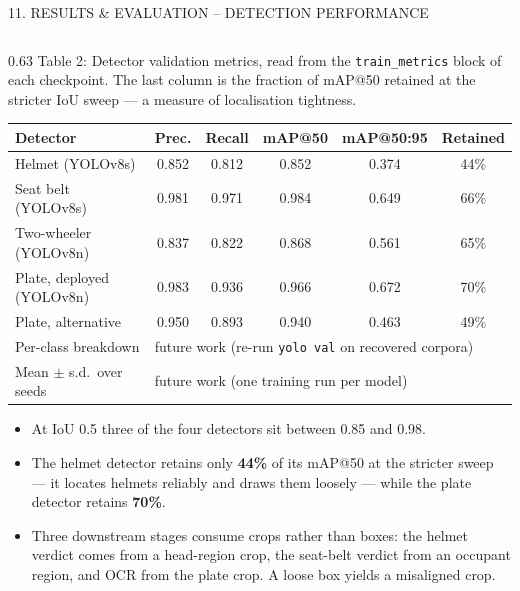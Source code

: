 \documentclass[aspectratio=169,10pt,t]{beamer}
\begin{document}
\begin{frame}{11. RESULTS \& EVALUATION -- DETECTION PERFORMANCE}
\begin{columns}[T,onlytextwidth]
\begin{column}{0.63\textwidth}
\scriptsize
{\tiny Table 2: Detector validation metrics, read from the \texttt{train\_metrics} block of each checkpoint. The last
column is the fraction of mAP@50 retained at the stricter IoU sweep --- a measure of localisation tightness.}\\[0.2em]
\setlength{\tabcolsep}{2.4pt}
\begin{tabular}{@{}lccccc@{}}
\toprule
\textbf{Detector} & \textbf{Prec.} & \textbf{Recall} & \textbf{mAP@50} & \textbf{mAP@50:95} & \textbf{Retained}\\
\midrule
Helmet (YOLOv8s) & 0.852 & 0.812 & 0.852 & 0.374 & 44\%\\
Seat belt (YOLOv8s) & 0.981 & 0.971 & 0.984 & 0.649 & 66\%\\
Two-wheeler (YOLOv8n) & 0.837 & 0.822 & 0.868 & 0.561 & 65\%\\
Plate, deployed (YOLOv8n) & 0.983 & 0.936 & 0.966 & 0.672 & 70\%\\
Plate, alternative & 0.950 & 0.893 & 0.940 & 0.463 & 49\%\\
\midrule
Per-class breakdown & \multicolumn{5}{l}{future work (re-run \texttt{yolo val} on recovered corpora)}\\
Mean $\pm$ s.d.\ over seeds & \multicolumn{5}{l}{future work (one training run per model)}\\
\bottomrule
\end{tabular}
\vspace{0.4em}
\begin{itemize}\setlength{\itemsep}{0.1em}
  \item At IoU 0.5 three of the four detectors sit between 0.85 and 0.98.
  \item The helmet detector retains only \textbf{44\%} of its mAP@50 at the stricter sweep --- it locates helmets
        reliably and draws them loosely --- while the plate detector retains \textbf{70\%}.
  \item Three downstream stages consume crops rather than boxes: the helmet verdict comes from a head-region crop, the
        seat-belt verdict from an occupant region, and OCR from the plate crop. A loose box yields a misaligned crop.
\end{itemize}
\end{column}

\end{columns}
\end{frame}
\end{document}
